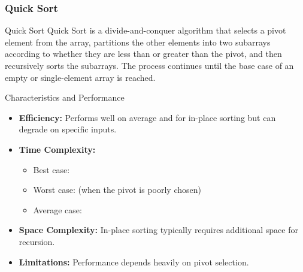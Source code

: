 \newpage
\subsubsection{Quick Sort}
\begin{definition}[]{Quick Sort}
    Quick Sort is a divide-and-conquer algorithm that selects a pivot element from the array, partitions the other elements into two subarrays according to whether they are less than or greater than the pivot, and then recursively sorts the subarrays. The process continues until the base case of an empty or single-element array is reached.
\end{definition}

\begin{properties}[]{Characteristics and Performance}
    \begin{itemize}
        \item \textbf{Efficiency:} Performs well on average and for in-place sorting but can degrade on specific inputs.
        \item \textbf{Time Complexity:}
              \begin{itemize}
                  \item Best case: 
                  \item Worst case:  (when the pivot is poorly chosen)
                  \item Average case: 
              \end{itemize}
        \item \textbf{Space Complexity:} In-place sorting typically requires  additional space for recursion.
        \item \textbf{Limitations:} Performance depends heavily on pivot selection.
    \end{itemize}
\end{properties}

